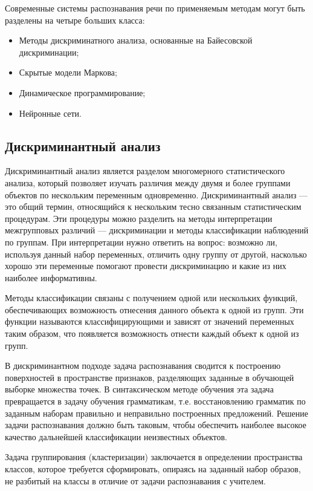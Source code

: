 \documentclass[a4paper,14pt,russian,utf8,nocolumnsxix,nocolumnxxxi,nocolumnxxxii]{eskdtext}
\begin{document}
Современные системы распознавания речи по применяемым методам могут быть разделены на четыре больших класса:
\begin{itemize}
\item
Методы дискриминатного анализа, основанные на Байесовской дискриминации;
\item
Скрытые модели Маркова;
\item
Динамическое программирование;
\item
Нейронные сети.
\end{itemize}

\subsection{Дискриминантный анализ}
Дискриминантный анализ является разделом многомерного статистического анализа, который позволяет изучать различия между двумя и более группами объектов по нескольким переменным одновременно. Дискриминантный анализ --- это общий термин, относящийся к нескольким тесно связанным статистическим процедурам. Эти процедуры можно разделить на методы интерпретации межгрупповых различий --- дискриминации и методы классификации наблюдений по группам. При интерпретации нужно ответить на вопрос: возможно ли, используя данный набор переменных, отличить одну группу от другой, насколько хорошо эти переменные помогают провести дискриминацию и какие из них наиболее информативны.

Методы классификации связаны с получением одной или нескольких функций, обеспечивающих возможность отнесения данного объекта к одной из групп. Эти функции называются классифицирующими и зависят от значений переменных таким образом, что появляется возможность отнести каждый объект к одной из групп.

В дискриминантном подходе задача распознавания сводится к построению поверхностей в пространстве признаков, разделяющих заданные в обучающей выборке множества точек. В синтаксическом методе обучения эта задача превращается в задачу обучения грамматикам, т.е. восстановлению грамматик по заданным наборам правильно и неправильно построенных предложений. Решение задачи распознавания должно быть таковым, чтобы обеспечить наиболее высокое качество дальнейшей классификации неизвестных объектов.

Задача группирования (кластеризации) заключается в определении пространства классов, которое требуется сформировать, опираясь на заданный набор образов, не разбитый на классы в отличие от задачи распознавания с учителем.
\end{document}

